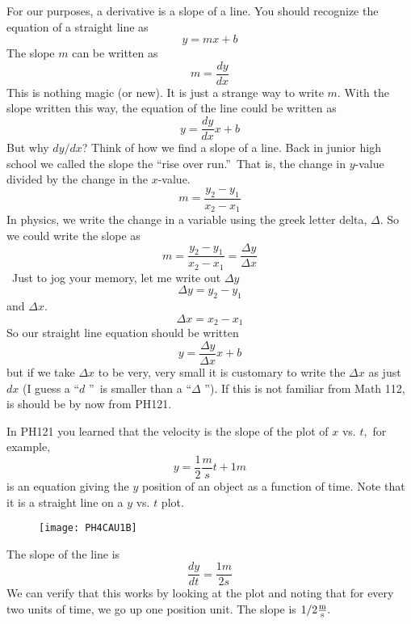 For our purposes, a derivative is a slope of a line. You should recognize
the equation of a straight line as%
\begin{equation*}
y=mx+b
\end{equation*}%
The slope $m$ can be written as 
\begin{equation*}
m=\frac{dy}{dx}
\end{equation*}%
This is nothing magic (or new). It is just a strange way to write $m.$ With
the slope written this way, the equation of the line could be written as 
\begin{equation*}
y=\frac{dy}{dx}x+b
\end{equation*}%
But why $dy/dx$? Think of how we find a slope of a line. Back in junior high
school we called the slope the \textquotedblleft rise over
run.\textquotedblright\ That is, the change in $y$-value divided by the
change in the $x$-value.%
\begin{equation*}
m=\frac{y_{2}-y_{1}}{x_{2}-x_{1}}
\end{equation*}%
In physics, we write the change in a variable using the greek letter delta, $%
\Delta .$ So we could write the slope as%
\begin{equation*}
m=\frac{y_{2}-y_{1}}{x_{2}-x_{1}}=\frac{\Delta y}{\Delta x}
\end{equation*}%
\ Just to jog your memory, let me write out $\Delta y$%
\begin{equation*}
\Delta y=y_{2}-y_{1}
\end{equation*}%
and $\Delta x.$ 
\begin{equation*}
\Delta x=x_{2}-x_{1}
\end{equation*}%
So our straight line equation should be written 
\begin{equation*}
y=\frac{\Delta y}{\Delta x}x+b
\end{equation*}%
but if we take $\Delta x$ to be very, very small it is customary to write
the $\Delta x$ as just $dx$ (I guess a \textquotedblleft $d$%
\textquotedblright\ is smaller than a \textquotedblleft $\Delta $%
\textquotedblright ). If this is not familiar from Math 112, is should be by
now from PH121.

In PH121 you learned that the velocity is the slope of the plot of $x$ vs. $%
t,$ for example, 
\begin{equation*}
y=\frac{1}{2}\frac{\unit{m}}{\unit{s}}t+1\unit{m}
\end{equation*}%
is an equation giving the $y$ position of an object as a function of time.
Note that it is a straight line on a $y$ vs. $t$ plot. \begin{figure}[h!]
\texttt{[image: PH4CAU1B]}
\end{figure}The slope of the line is 
\begin{equation*}
\frac{dy}{dt}=\frac{1\unit{m}}{2\unit{s}}
\end{equation*}%
We can verify that this works by looking at the plot and noting that for
every two units of time, we go up one position unit. The slope is $1/2\frac{%
\unit{m}}{\unit{s}}.$

